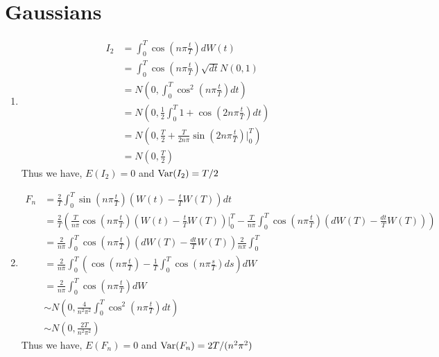 \documentclass{article}
\begin{document}
\section{Gaussians}
    \begin{enumerate}[label=\roman*)]
        \item 
            \begin{align*}
                I_2 &= \int_0^T\cos\left(n\pi\frac{t}{T}\right)dW(t)
                \\
                &= \int_0^T\cos\left(n\pi\frac{t}{T}\right)\sqrt{dt}N(0,1)
                \\
                &= N\left(0, \int_0^T\cos^2\left(n\pi\frac{t}{T}\right)dt\right)
                \\
                &= N\left(0, \frac{1}{2}\int_0^T1 + \cos\left(2n\pi\frac{t}{T}\right)dt\right)
                \\
                &= N\left(0,
                \frac{T}{2}+\frac{T}{2n\pi}\sin\left(2n\pi\frac{t}{T}\right)\Big|_0^T\right)
                \\
                &= N\left(0, \frac{T}{2}\right)
            \end{align*}
            Thus we have, $E(I_2) = 0$ and $\text{Var}(I_2) = T/2$
        \item 
            \begin{align*}
                F_n &=
                \frac{2}{T}\int_0^T\sin\left(n\pi\frac{t}{T}\right)\left(W(t) -
                \frac{t}{T}W(T)\right)dt
                \\
                &=
                \frac{2}{T}\left(\frac{T}{n\pi}\cos\left(n\pi\frac{t}{T}\right)
                \left(W(t) - \frac{t}{T}W(T)\right)\Big|_0^T - 
                \frac{T}{n\pi}\int_0^T\cos\left(n\pi\frac{t}{T}\right)
                \left(dW(T) - \frac{dt}{T}W(T)\right)\right)
                \\
                &= \frac{2}{n\pi}\int_0^T\cos\left(n\pi\frac{t}{T}\right)
                \left(dW(T) - \frac{dt}{T}W(T)\right)
                \frac{2}{n\pi}\int_0^T
                \\
                &= \frac{2}{n\pi}\int_0^T\left(\cos\left(n\pi\frac{t}{T}\right)
                - \frac{1}{T}\int_0^T\cos\left(n\pi\frac{s}{T}\right)ds\right)dW
                \\
                &= \frac{2}{n\pi}\int_0^T\cos\left(n\pi\frac{t}{T}\right)dW
                \\
                &\sim
                N\left(0,\frac{4}{n^2\pi^2}\int_0^T
                \cos^2\left(n\pi\frac{t}{T}\right)dt\right)
                \\
                &\sim N\left(0,\frac{2T}{n^2\pi^2}\right)
            \end{align*} 
            Thus we have, $E(F_n) = 0$ and $\text{Var}(F_n) = 2T/(n^2\pi^2)$
    \end{enumerate}
\end{document}
